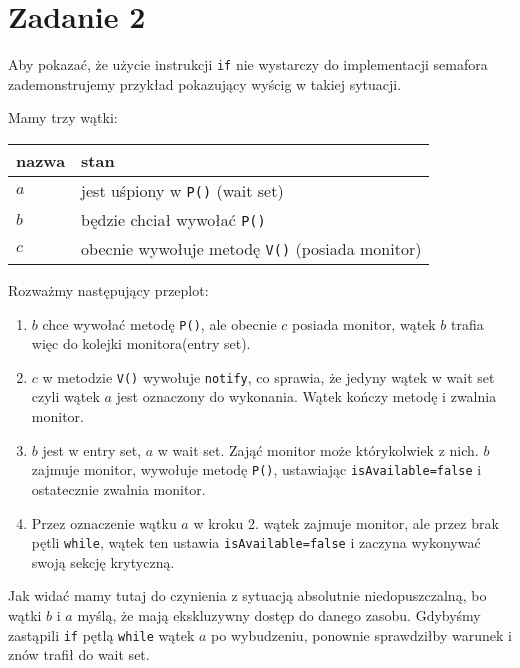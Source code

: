 \documentclass[11pt]{article}
\begin{document}
\section*{Zadanie 2}
\label{sec:org512295d}
Aby pokazać, że użycie instrukcji \texttt{if} nie wystarczy do implementacji semafora
zademonstrujemy przykład pokazujący wyścig w takiej sytuacji.

Mamy trzy wątki:
\begin{center}
\begin{tabular}{ll}
nazwa & stan\\
\hline
\(a\) & jest uśpiony w \texttt{P()} (wait set)\\
\(b\) & będzie chciał wywołać \texttt{P()}\\
\(c\) & obecnie wywołuje metodę \texttt{V()} (posiada monitor)\\
\end{tabular}
\end{center}

Rozważmy następujący przeplot:
\begin{enumerate}
\item \(b\) chce wywołać metodę \texttt{P()}, ale obecnie \(c\) posiada monitor, wątek \(b\) trafia więc
do kolejki monitora(entry set).
\item \(c\) w metodzie \texttt{V()} wywołuje \texttt{notify}, co sprawia, że jedyny wątek w wait set
czyli wątek \(a\) jest oznaczony do wykonania. Wątek kończy metodę i zwalnia monitor.
\item \(b\) jest w entry set, \(a\) w wait set. Zająć monitor może którykolwiek z nich.
\(b\) zajmuje monitor, wywołuje metodę \texttt{P()}, ustawiając \texttt{isAvailable=false} i
ostatecznie zwalnia monitor.
\item Przez oznaczenie wątku \(a\) w kroku 2. wątek zajmuje monitor, ale przez
brak pętli \texttt{while}, wątek ten ustawia \texttt{isAvailable=false} i zaczyna wykonywać swoją sekcję krytyczną.
\end{enumerate}

Jak widać mamy tutaj do czynienia z sytuacją absolutnie niedopuszczalną, bo
wątki \(b\) i \(a\) myślą, że mają ekskluzywny dostęp do danego zasobu.  Gdybyśmy
zastąpili \texttt{if} pętlą \texttt{while} wątek \(a\) po wybudzeniu, ponownie sprawdziłby warunek i
znów trafił do wait set.
\end{document}
